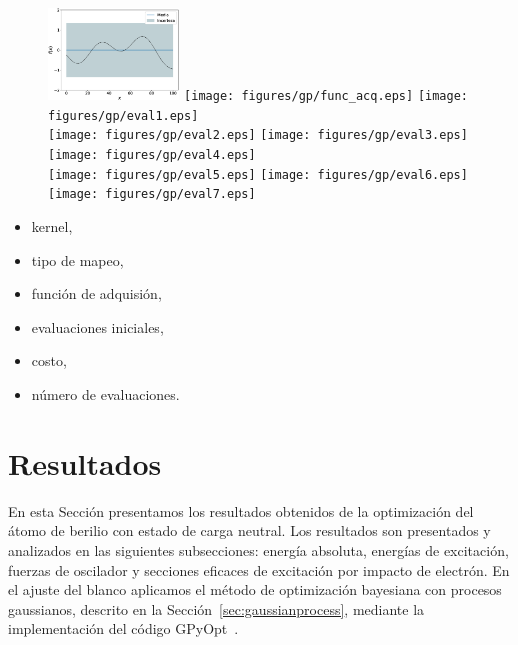 \begin{figure}[H]
\centering
 \includegraphics[width=0.31\textwidth]{figures/gp/funcion.eps} 
 \texttt{[image: figures/gp/func\_acq.eps]} 
 \texttt{[image: figures/gp/eval1.eps]} \\
  \texttt{[image: figures/gp/eval2.eps]}
  \texttt{[image: figures/gp/eval3.eps]}
  \texttt{[image: figures/gp/eval4.eps]} \\
  \texttt{[image: figures/gp/eval5.eps]}
  \texttt{[image: figures/gp/eval6.eps]}
  \texttt{[image: figures/gp/eval7.eps]} 
\end{figure}

\begin{itemize}
\item kernel, 
\item tipo de mapeo, 
\item función de adquisión, 
\item evaluaciones iniciales,
\item costo, 
\item número de evaluaciones.
\end{itemize}

\newpage
\section{Resultados}

En esta Sección presentamos los resultados obtenidos de la optimización
del átomo de berilio con estado de carga neutral. Los resultados son 
presentados y analizados en las siguientes subsecciones: energía 
absoluta, energías de excitación, fuerzas de oscilador y secciones 
eficaces de excitación por impacto de electrón. En el ajuste del blanco 
aplicamos el método de optimización bayesiana con procesos gaussianos, 
descrito en la Sección~\ref{sec:gaussianprocess}, mediante la 
implementación del código GPyOpt~\cite{GPyOpt}.

